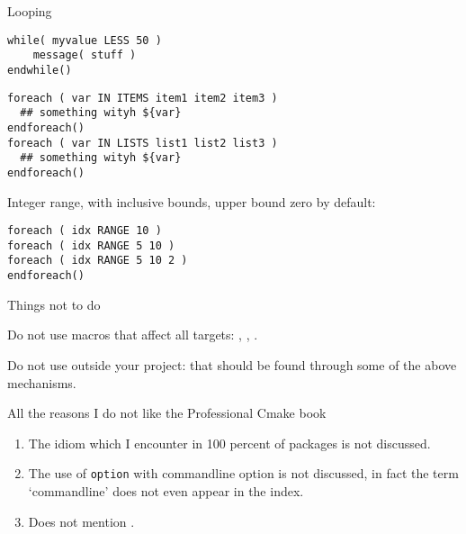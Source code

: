 {Looping}

\begin{lstlisting}
while( myvalue LESS 50 )
    message( stuff )
endwhile()
\end{lstlisting}

\begin{lstlisting}
foreach ( var IN ITEMS item1 item2 item3 )
  ## something wityh ${var}
endforeach()
foreach ( var IN LISTS list1 list2 list3 )
  ## something wityh ${var}
endforeach()
\end{lstlisting}

Integer range, with inclusive bounds, upper bound zero by default:
\begin{lstlisting}
foreach ( idx RANGE 10 )
foreach ( idx RANGE 5 10 )
foreach ( idx RANGE 5 10 2 )
endforeach()
\end{lstlisting}

 {Things not to do}

Do not use macros that affect all targets: ,
, .

Do not use  outside your project:
that should be found through some of the above mechanisms.

 {All the reasons I do not like the Professional Cmake book}

\begin{enumerate}
\item The  idiom which I encounter in 100 percent of packages is not discussed.
\item The use of \lstinline{option} with commandline option is not discussed,
  in fact the term `commandline' does not even appear in the index.
\item Does not mention .
\end{enumerate}
